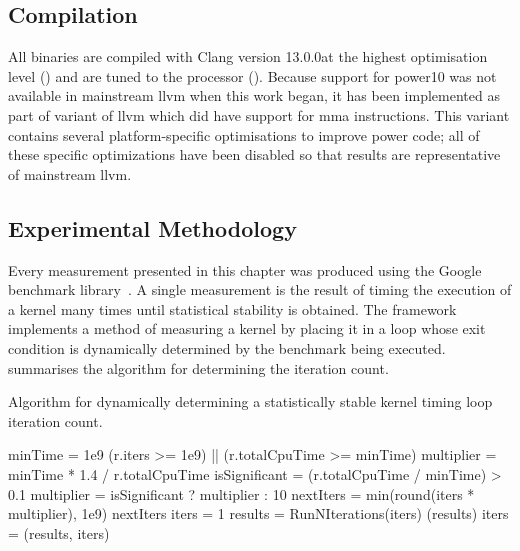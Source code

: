 \documentclass[\main/thesis.tex]{subfiles}
\begin{document}
\subsection{Compilation}
All binaries are compiled with Clang version 13.0.0\footnotemark at the highest optimisation level () and are tuned to the processor ().
Because support for \gls{power10} was not available in mainstream \gls{llvm} when this work began, it has been implemented as part of  variant of \gls{llvm} which did have support for \gls{mma} instructions.
This variant contains several platform-specific optimisations to improve \gls{power} code; all of these specific optimizations have been disabled so that results are representative of mainstream \gls{llvm}.

\subsection{Experimental Methodology}
Every measurement presented in this chapter was produced using the Google\texttrademark{} benchmark library\footnotemark~\autocite{googlebench}.
A single measurement is the result of timing the execution of a kernel many times until statistical stability is obtained.
The framework implements a method of measuring a kernel by placing it in a loop whose exit condition is dynamically determined by the benchmark being executed.
 summarises the algorithm for determining the iteration count.

\begin{algorithm}[t]
  \caption[Algorithm for creating a cycle measurement]{Algorithm for dynamically determining a statistically stable kernel timing loop iteration count.}
  \label{alg:benchmark}
  \begin{algorithmic}[1]
    \State minTime = 1e9 
      \State \Return (r.iters >= 1e9) || (r.totalCpuTime >= minTime)
    \EndFunction
      \State multiplier = minTime * 1.4 / r.totalCpuTime
      \State isSignificant = (r.totalCpuTime / minTime) > 0.1
      \State multiplier = isSignificant ? multiplier : 10
      \State nextIters = min(round(iters * multiplier), 1e9)
      \State \Return nextIters
    \EndFunction
      \State iters = 1
        \State results = RunNIterations(iters)
          \State {}(results)
          \State \Return
        \EndIf
        \State iters = (results, iters)
      \EndWhile
    \EndFunction
  \end{algorithmic}
\end{algorithm}
\end{document}
